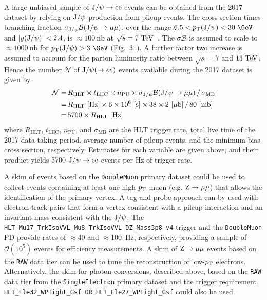 A large unbiased sample of $\mathrm{J/}\psi\to\mathrm{ee}$ events can be obtained from the
2017 dataset by relying on $\mathrm{J/}\psi$ production from pileup events. The
cross section times branching fraction $\sigma_{\mathrm{J/}\psi}
\mathcal{B}(\mathrm{J/}\psi\to\mu\mu)$, over the range $6.5 < \pt(\jpsi) < 30~\GeV$ and
$|y(\mathrm{J/}\psi)| < 2.4$, is ${\approx}100~\mathrm{nb}$ at $\sqrt{s} =
7~\rm{TeV}$~\cite{Khachatryan:2010yr}. The $\sigma\mathcal{B}$ is assumed
to scale to ${\approx}1000~\textrm{nb}$ for $\pt(\jpsi) > 3~\GeV$
(Fig.~3~\cite{Khachatryan:2010yr}). A further factor two increase is
assumed to account for the parton luminosity ratio between $\sqrt{s} =
7$ and $13~\rm{TeV}$. Hence the number $\mathcal{N}$ of $\mathrm{J/}\psi(\to ee)$
events available during the 2017 dataset is given by
\begin{equation}
  \begin{split}
    \mathcal{N} = &\, R_\mathrm{HLT} \times t_\mathrm{LHC} \times
    n_\mathrm{PU} \times \sigma_{\mathrm{J/}\psi}
    \mathcal{B}(\mathrm{J/}\psi\to\mu\mu) \,/\, \sigma_\mathrm{MB} \\
    = &\, R_\mathrm{HLT}~\mathrm{[Hz]} \times 6 \times
    10^{6}~\mathrm{[s]} \times 38 \times 2~\mathrm{[{\mu}b]} \,/\,
    80~\mathrm{[mb]} \\
    = &\, 5700 \times R_\mathrm{HLT}~\textrm{[Hz]}
  \end{split}
\end{equation}
where $R_\mathrm{HLT}$, $t_\mathrm{LHC}$, $n_\mathrm{PU}$, and
$\sigma_\mathrm{MB}$ are the HLT trigger rate, total live time of the
2017 data-taking period, average number of pileup events, and the
minimum bias cross section, respectively. Estimates for each variable
are given above, and their product yields 5700 $\mathrm{J/}\psi\to\mathrm{ee}$ events per Hz
of trigger rate.

A skim of events based on the \verb!DoubleMuon! primary dataset could
be used to collect events containing at least one high-$p_\mathrm{T}$ muon
(e.g. $\mathrm{Z}\to\mu\mu$) that allows the identification of the primary vertex. A
tag-and-probe approach can by used with electron-track pairs that form
a vertex consistent with a pileup interaction and an invariant mass
consistent with the $\mathrm{J/}\psi$. The
\verb!HLT_Mu17_TrkIsoVVL_Mu8_TrkIsoVVL_DZ_Mass3p8_v4! trigger and the
\verb!DoubleMuon! PD provide rates of ${\approx}$40 and
${\approx}$100~Hz, respectively, providing a sample of
$\mathcal{O}(10^5)$ events for efficiency measurements. A skim of
$\mathrm{Z}\to\mu\mu$ events based on the \verb!RAW! data tier can be used to tune
the reconstruction of low-$p_\mathrm{T}$ electrons. Alternatively, the skim for
photon conversions, described above, based on the \verb!RAW! data tier
from the \verb!SingleElectron! primary dataset and the trigger
requirement \texttt{HLT\_Ele32\_WPTight\_Gsf OR
  HLT\_Ele27\_WPTight\_Gsf} could also be used.

